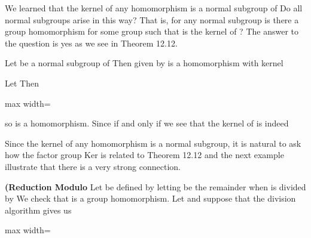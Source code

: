 \documentclass[11pt,oneside]{article}
\begin{document}
\begin{BookBody}

\noindent We learned that the kernel of any homomorphism  is a normal subgroup of  Do all normal subgroups arise in this way? That is, for any normal subgroup  is there a group homomorphism  for some group  such that  is the kernel of ? The answer to the question is yes as we see in Theorem 12.12.

 Let  be a normal subgroup of  Then  given by  is a homomorphism with kernel 

 Let  Then

\begin{center}\begin{adjustbox}{max width=\linewidth}\end{adjustbox}\end{center}

\noindent so \BookInline{\gamma } is a homomorphism. Since  if and only if  we see that the kernel of \BookInline{\gamma } is indeed \BookEnd{\blacklozenge}

Since the kernel of any homomorphism  is a normal subgroup, it is natural to ask how the factor group Ker\BookInline{(\phi )} is related to  Theorem 12.12 and the next example illustrate that there is a very strong connection.

 \textbf{(Reduction Modulo}  Let  be defined by letting  be the remainder when  is divided by  We check that \BookInline{\phi } is a group homomorphism. Let  and suppose that the division algorithm gives us

\begin{center}\begin{adjustbox}{max width=\linewidth}\end{adjustbox}\end{center}


\end{BookBody}
\end{document}

